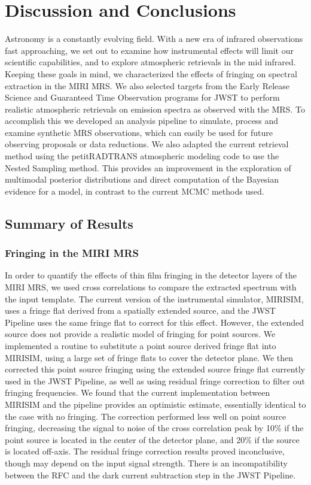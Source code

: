 \chapter{Discussion and Conclusions}
Astronomy is a constantly evolving field. 
With a new era of  infrared observations fast approaching, we set out to examine how instrumental effects will limit our scientific capabilities, and to explore atmospheric retrievals in the mid infrared.
Keeping these goals in mind, we characterized the effects of fringing on spectral extraction in the MIRI MRS.
We also selected targets from the Early Release Science and Guaranteed Time Observation programs for JWST to perform realistic atmospheric retrievals on emission spectra as observed with the MRS.
To accomplish this we developed an analysis pipeline to simulate, process and examine synthetic MRS observations, which can easily be used for future observing proposals or data reductions.
We also adapted the current retrieval method using the petitRADTRANS atmospheric modeling code to use the Nested Sampling method. 
This provides an improvement in the exploration of multimodal posterior distributions and direct computation of the Bayesian evidence for a model, in contrast to the current MCMC methods used.

\section{Summary of Results}
\subsection{Fringing in the MIRI MRS}
In order to quantify the effects of thin film fringing in the detector layers of the MIRI MRS, we used cross correlations to compare the extracted spectrum with the input template.
The current version of the instrumental simulator, MIRISIM, uses a fringe flat derived from a spatially extended source, and the JWST Pipeline uses the same fringe flat to correct for this effect.
However, the extended source does not provide a realistic model of fringing for point sources. 
We implemented a routine to substitute a point source derived fringe flat into MIRISIM, using a large set of fringe flats to cover the detector plane.
We then corrected this point source fringing using the extended source fringe flat currently used in the JWST Pipeline, as well as using residual fringe correction to filter out fringing frequencies.
We found that the current implementation between MIRISIM and the pipeline provides an optimistic estimate, essentially identical to the case with no fringing.
The correction performed less well on point source fringing, decreasing the signal to noise of the cross correlation peak by 10\% if the point source is located in the center of the detector plane, and 20\% if the source is located off-axis.
The residual fringe correction results proved inconclusive, though may depend on the input signal strength.
There is an incompatibility between the RFC and the dark current subtraction step in the JWST Pipeline. 

